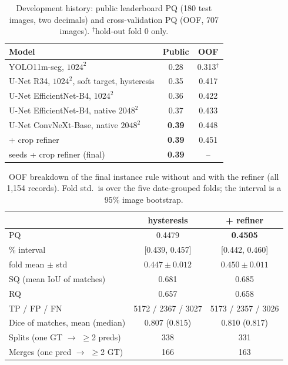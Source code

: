 \documentclass[sigconf]{acmart}
\begin{document}
\begin{table}[t]
  \centering
  \caption{Development history: public leaderboard PQ (180 test images, two decimals) and cross-validation PQ (OOF, 707 images). $^\dagger$hold-out fold 0 only.}
  \label{tab:progress}
  \small
  \begin{tabular}{@{}lcc@{}}
    \toprule
    Model & Public & OOF \\
    \midrule
    YOLO11m-seg, $1024^2$ & 0.28 & 0.313$^\dagger$ \\
    U-Net R34, $1024^2$, soft target, hysteresis & 0.35 & 0.417 \\
    U-Net EfficientNet-B4, $1024^2$ & 0.36 & 0.422 \\
    U-Net EfficientNet-B4, native $2048^2$ & 0.37 & 0.433 \\
    U-Net ConvNeXt-Base, native $2048^2$ & \textbf{0.39} & 0.448 \\
    \quad + crop refiner & \textbf{0.39} & 0.451 \\
    \quad 2 seeds + crop refiner (final) & \textbf{0.39} & -- \\
    \bottomrule
  \end{tabular}
\end{table}

\begin{table}[t]
  \centering
  \caption{OOF breakdown of the final instance rule without and with the refiner (all 1,154 records). Fold std.\ is over the five date-grouped folds; the interval is a 95\% image bootstrap.}
  \label{tab:stats}
  \small
  \begin{tabular}{@{}lcc@{}}
    \toprule
     & hysteresis & + refiner \\
    \midrule
    PQ & 0.4479 & \textbf{0.4505} \\
    \quad 95\% interval & [0.439, 0.457] & [0.442, 0.460] \\
    \quad fold mean $\pm$ std & $0.447 \pm 0.012$ & $0.450 \pm 0.011$ \\
    SQ (mean IoU of matches) & 0.681 & 0.685 \\
    RQ & 0.657 & 0.658 \\
    TP / FP / FN & 5172 / 2367 / 3027 & 5173 / 2357 / 3026 \\
    Dice of matches, mean (median) & 0.807 (0.815) & 0.810 (0.817) \\
    Splits (one GT $\rightarrow$ $\geq$2 preds) & 338 & 331 \\
    Merges (one pred $\rightarrow$ $\geq$2 GT) & 166 & 163 \\
    \bottomrule
  \end{tabular}
\end{table}
\end{document}
